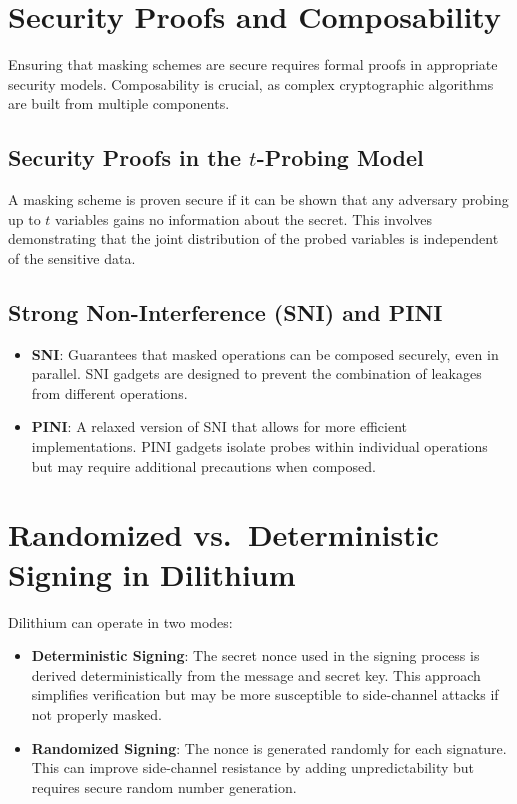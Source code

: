 \section{Security Proofs and Composability}

Ensuring that masking schemes are secure requires formal proofs in appropriate security models. Composability is crucial, as complex cryptographic algorithms are built from multiple components.

\subsection{Security Proofs in the $t$-Probing Model}

A masking scheme is proven secure if it can be shown that any adversary probing up to $t$ variables gains no information about the secret. This involves demonstrating that the joint distribution of the probed variables is independent of the sensitive data.

\subsection{Strong Non-Interference (SNI) and PINI}

\begin{itemize}
    \item \textbf{SNI}: Guarantees that masked operations can be composed securely, even in parallel. SNI gadgets are designed to prevent the combination of leakages from different operations.
    \item \textbf{PINI}: A relaxed version of SNI that allows for more efficient implementations. PINI gadgets isolate probes within individual operations but may require additional precautions when composed.
\end{itemize}

\section{Randomized vs.\ Deterministic Signing in Dilithium}

Dilithium can operate in two modes:

\begin{itemize}
    \item \textbf{Deterministic Signing}: The secret nonce used in the signing process is derived deterministically from the message and secret key. This approach simplifies verification but may be more susceptible to side-channel attacks if not properly masked.
    \item \textbf{Randomized Signing}: The nonce is generated randomly for each signature. This can improve side-channel resistance by adding unpredictability but requires secure random number generation.
\end{itemize}

